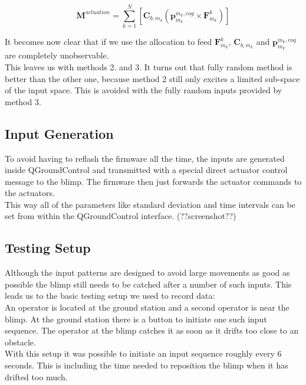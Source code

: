 \begin{equation}
\label{eq:m_actuation}
\mathbf{M}^{actuation} = \sum_{k=1}^N  \left[  \mathbf{C}_{b,m_k} \left( \mathbf{p}^{m_k,cog}_{m_k} \times \mathbf{F}^k_{m_k} \right)  \right]
\end{equation}

It becomes now clear that if we use the allocation to feed $\mathbf{F}^k_{m_k}$, $\mathbf{C}_{b,m_k}$ and $\mathbf{p}^{m_k,cog}_{m_k}$ are completely unobservable.\\
This leaves us with methods 2. and 3.
It turns out that fully random method is better than the other one, because method 2 still only excites a limited sub-space of the input space. This is avoided with the fully random inputs provided by method 3.\\

\subsection{Input Generation}
\label{sub:input_generation}
To avoid having to reflash the firmware all the time, the inputs are generated inside QGroundControl and transmitted with a special direct actuator control message to the blimp.
The firmware then just forwards the actuator commands to the actuators. \\
This way all of the parameters like standard deviation and time intervals can be set from within the QGroundControl interface. (??screenshot??)\\

\subsection{Testing Setup}
\label{sub:testing_setup}
Although the input patterns are designed to avoid large movements as good as possible the blimp still needs to be catched after a number of such inputs. This leads us to the basic testing setup we used to record data: \\
An operator is located at the ground station and a second operator is near the blimp.
At the ground station there is a button to initiate one such input sequence.
The operator at the blimp catches it as soon as it drifts too close to an obstacle. \\
With this setup it was possible to initiate an input sequence roughly every 6 seconds. 
This is including the time needed to reposition the blimp when it has drifted too much.


